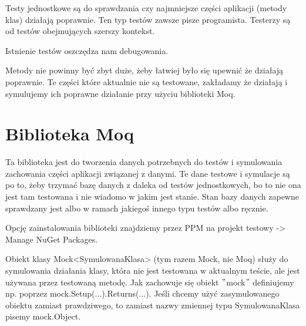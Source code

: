 \documentclass[10pt]{article}
\begin{document}
Testy jednostkowe są do sprawdzania czy najmniejsze części aplikacji (metody klas) działają poprawnie. Ten typ testów zawsze pisze programista. Testerzy są od testów obejmujących szerszy kontekst.

Istnienie testów oszczędza nam debugowania.

Metody nie powinny być zbyt duże, żeby łatwiej było się upewnić że działają poprawnie. Te części które aktualnie nie są testowane, zakładamy że działają i symulujemy ich poprawne działanie przy użyciu biblioteki Moq.

\section{Biblioteka Moq}
Ta biblioteka jest do tworzenia danych potrzebnych do testów i symulowania zachowania części aplikacji związanej z danymi. Te dane testowe i symulacje są po to, żeby trzymać bazę danych z daleka od testów jednostkowych, bo to nie ona jest tam testowana i nie wiadomo w jakim jest stanie. Stan bazy danych zapewne sprawdzany jest albo w ramach jakiegoś innego typu testów albo ręcznie.

Opcję zainstalowania biblioteki znajdziemy przez PPM na projekt testowy -> Manage NuGet Packages.

Obiekt klasy Mock<SymulowanaKlasa> (tym razem Mock, nie Moq) służy do symulowania działania klasy, która nie jest testowana w aktualnym teście, ale jest używana przez testowaną metodę. Jak zachowuje się obiekt $"$mock$"$ definiujemy np. poprzez mock.Setup(...).Returns(...). Jeśli chcemy użyć zasymulowanego obiektu zamiast prawdziwego, to zamiast nazwy zmiennej typu SymulowanaKlasa pisemy mock.Object.
\end{document}
